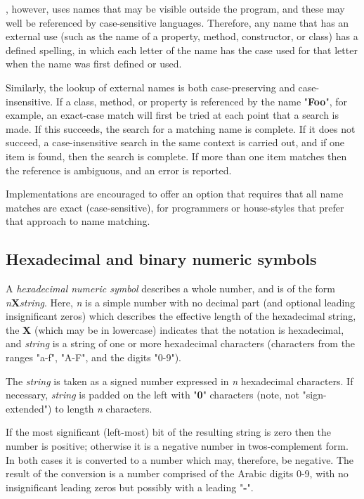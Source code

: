 \nr{}, however, uses names that may be visible outside the \nr{}
program, and these may well be referenced by case-sensitive languages.
Therefore, any name that has an external use (such as the name of a
property, method, constructor, or class) has a defined spelling, in
which each letter of the name has the case used for that letter when the
name was first defined or used.
 
Similarly, the lookup of external names is both case-preserving and
case-insensitive.  If a class, method, or property is referenced by the
name "\textbf{Foo}", for example, an exact-case match will first
be tried at each point that a search is made.
If this succeeds, the search for a matching name is complete.
If it does not succeed, a case-insensitive search in the same context
is carried out, and if one item is found, then the search is complete.
If more than one item matches then the reference is ambiguous, and an
error is reported.
 
Implementations are encouraged to offer an option that requires that all
name matches are exact (case-sensitive), for programmers or house-styles
that prefer that approach to name matching.
\subsection{Hexadecimal and binary numeric symbols}\label{refhexbin}
 
A \emph{hexadecimal numeric symbol} describes a whole number, and is
of the form \emph{n}\textbf{X}\emph{string}.  Here,
\emph{n} is a simple number with no decimal part (and optional
leading insignificant zeros) which describes the effective length of the
hexadecimal string, the \textbf{X} (which may be in lowercase) indicates
that the notation is hexadecimal, and \emph{string} is a string of
one or more hexadecimal characters (characters from the ranges
"a-f", "A-F", and the digits "0-9").
 
The \emph{string} is taken as a signed number expressed in
\emph{n} hexadecimal characters.  If necessary, \emph{string} is
padded on the left with "\textbf{0}" characters (note, not
"sign-extended") to length \emph{n} characters.
 
If the most significant (left-most) bit of the resulting string is zero
then the number is positive; otherwise it is a negative number in
twos-complement form.  In both cases it is converted to a \nr{} number
which may, therefore, be negative.  The result of the conversion is a
number comprised of the Arabic digits 0-9, with no insignificant leading
zeros but possibly with a leading "\textbf{-}".
 
